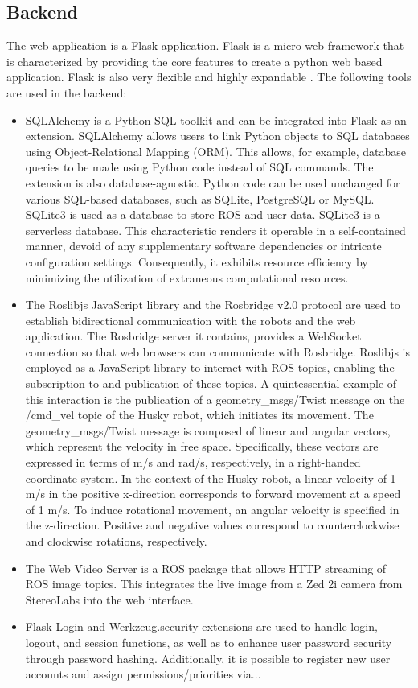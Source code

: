 \documentclass[conference]{IEEEtran}
\begin{document}
\subsection{Backend}
The web application is a Flask application. Flask is a micro web framework that is characterized by providing the core features to create a python web based application. 
Flask is also very flexible and highly expandable \cite{flasksqlite}. The following tools are used in the backend:
\begin{itemize}
\item SQLAlchemy is a Python SQL toolkit and can be integrated into Flask as an extension. SQLAlchemy allows users to link Python objects to SQL databases using Object-Relational Mapping (ORM). This allows, for example, database queries to be made using Python code instead of SQL commands. The extension is also database-agnostic. 
Python code can be used unchanged for various SQL-based databases, such as SQLite, PostgreSQL or MySQL. 
SQLite3 is used as a database to store ROS and user data. SQLite3 is a serverless database. This characteristic renders it operable in a self-contained manner, devoid of any supplementary software dependencies or intricate configuration settings. Consequently, it exhibits resource efficiency by minimizing the utilization of extraneous computational resources.
\item The Roslibjs JavaScript library and the Rosbridge v2.0 protocol are used to establish bidirectional communication with the robots and the web application. The Rosbridge server it contains, provides a WebSocket connection so that web browsers can communicate with Rosbridge.
Roslibjs is employed as a JavaScript library to interact with ROS topics, enabling the subscription to and publication of these topics. A quintessential example of this interaction is the publication of a geometry\_msgs/Twist message on the /cmd\_vel topic of the Husky robot, which initiates its movement.
The geometry\_msgs/Twist message is composed of linear and angular vectors, which represent the velocity in free space. Specifically, these vectors are expressed in terms of m/s and rad/s, respectively, in a right-handed coordinate system.
In the context of the Husky robot, a linear velocity of 1 m/s in the positive x-direction corresponds to forward movement at a speed of 1 m/s. To induce rotational movement, an angular velocity is specified in the z-direction. Positive and negative values correspond to counterclockwise and clockwise rotations, respectively.
\item The Web Video Server is a ROS package that allows HTTP streaming of ROS image topics. This integrates the live image from a Zed 2i camera from StereoLabs into the web interface.
\item Flask-Login and Werkzeug.security extensions are used to handle login, logout, and session functions, as well as to enhance user password security through password hashing. Additionally, it is possible to register new user accounts and assign permissions/priorities via...
\end{itemize}
\end{document}
